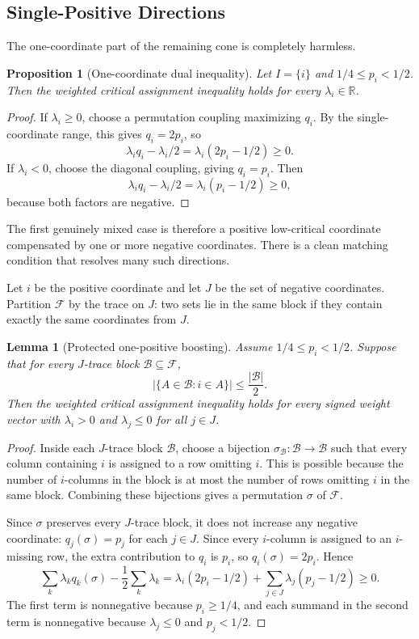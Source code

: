 \documentclass[11pt]{article}
\newtheorem{lemma}{Lemma}
\newtheorem{proposition}{Proposition}
\begin{document}
\subsection{Single-Positive Directions}

The one-coordinate part of the remaining cone is completely harmless.

\begin{proposition}[One-coordinate dual inequality]
Let $I=\{i\}$ and $1/4\leq p_i<1/2$.  Then the weighted critical assignment
inequality holds for every $\lambda_i\in\mathbb{R}$.
\end{proposition}

\begin{proof}
If $\lambda_i\geq0$, choose a permutation coupling maximizing $q_i$.  By the
single-coordinate range, this gives $q_i=2p_i$, so
\[
  \lambda_i q_i-\lambda_i/2
  =
  \lambda_i(2p_i-1/2)\geq0.
\]
If $\lambda_i<0$, choose the diagonal coupling, giving $q_i=p_i$.  Then
\[
  \lambda_i q_i-\lambda_i/2
  =
  \lambda_i(p_i-1/2)\geq0,
\]
because both factors are negative.
\end{proof}

The first genuinely mixed case is therefore a positive low-critical
coordinate compensated by one or more negative coordinates.  There is a clean
matching condition that resolves many such directions.

Let $i$ be the positive coordinate and let $J$ be the set of negative
coordinates.  Partition $\mathcal{F}$ by the trace on $J$: two sets lie in the
same block if they contain exactly the same coordinates from $J$.

\begin{lemma}[Protected one-positive boosting]
Assume $1/4\leq p_i<1/2$.  Suppose that for every $J$-trace block
$\mathcal{B}\subseteq\mathcal{F}$,
\[
  |\{A\in\mathcal{B}:i\in A\}|
  \leq
  \frac{|\mathcal{B}|}{2}.
\]
Then the weighted critical assignment inequality holds for every signed
weight vector with $\lambda_i>0$ and $\lambda_j\leq0$ for all $j\in J$.
\end{lemma}

\begin{proof}
Inside each $J$-trace block $\mathcal{B}$, choose a bijection
$\sigma_{\mathcal{B}}:\mathcal{B}\to\mathcal{B}$ such that every column
containing $i$ is assigned to a row omitting $i$.  This is possible because
the number of $i$-columns in the block is at most the number of rows omitting
$i$ in the same block.  Combining these bijections gives a permutation
$\sigma$ of $\mathcal{F}$.

Since $\sigma$ preserves every $J$-trace block, it does not increase any
negative coordinate: $q_j(\sigma)=p_j$ for each $j\in J$.  Since every
$i$-column is assigned to an $i$-missing row, the extra contribution to
$q_i$ is $p_i$, so $q_i(\sigma)=2p_i$.  Hence
\[
  \sum_k\lambda_k q_k(\sigma)-\frac12\sum_k\lambda_k
  =
  \lambda_i(2p_i-1/2)
  +
  \sum_{j\in J}\lambda_j(p_j-1/2)
  \geq0.
\]
The first term is nonnegative because $p_i\geq1/4$, and each summand in the
second term is nonnegative because $\lambda_j\leq0$ and $p_j<1/2$.
\end{proof}
\end{document}
